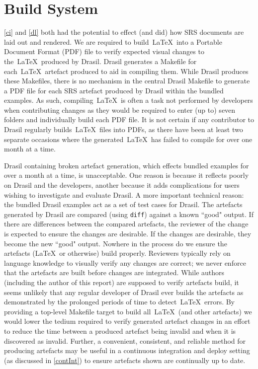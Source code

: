 \chapter{Build System}\label{bs}

\autoref{ci} and \autoref{dl} both had the potential to effect (and did) how SRS documents are laid out and rendered. We are required to build\ \LaTeX\ into a Portable Document Format (PDF) file to verify expected visual changes to the\ \LaTeX\ produced by Drasil. Drasil generates a Makefile for each\ \LaTeX\ artefact produced to aid in compiling them. While Drasil produces these Makefiles, there is no mechanism in the central Drasil Makefile to generate a PDF file for each SRS artefact produced by Drasil within the bundled examples. As such, compiling\ \LaTeX\ is often a task not performed by developers when contributing changes as they would be required to enter (up to) seven folders and individually build each PDF file. It is not certain if any contributor to Drasil regularly builds\ \LaTeX\ files into PDFs, as there have been at least two separate occasions where the generated\ \LaTeX\ has failed to compile for over one month at a time. 

Drasil containing broken artefact generation, which effects bundled examples for over a month at a time, is unacceptable. One reason is because it reflects poorly on Drasil and the developers, another because it adds complications for users wishing to investigate and evaluate Drasil. A more important technical reason: the bundled Drasil examples act as a set of test cases for Drasil. The artefacts generated by Drasil are compared (using \texttt{diff}) against a known ``good" output. If there are differences between the compared artefacts, the reviewer of the change is expected to ensure the changes are desirable. If the changes are desirable, they become the new ``good" output. Nowhere in the process do we ensure the artefacts (\LaTeX\ or otherwise) build properly. Reviewers typically rely on language knowledge to visually verify any changes are correct; we never enforce that the artefacts are built before changes are integrated. While authors (including the author of this report) are supposed to verify artefacts build, it seems unlikely that any regular developer of Drasil ever builds the artefacts as demonstrated by the prolonged periods of time to detect\ \LaTeX\ errors. By providing a top-level Makefile target to build all\ \LaTeX\ (and other artefacts) we would lower the tedium required to verify generated artefact changes in an effort to reduce the time between a produced artefact being invalid and when it is discovered as invalid. Further, a convenient, consistent, and reliable method for producing artefacts may be useful in a continuous integration and deploy setting (as discussed in \autoref{contInt}) to ensure artefacts shown are continually up to date.

